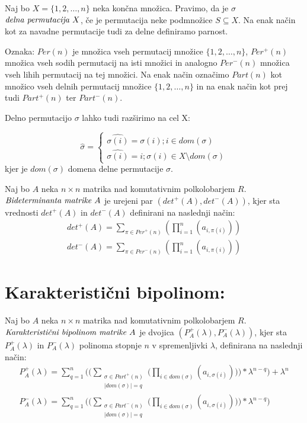 \documentclass[mat1]{fmfdelo}
\newcommand{\abs}[1]{\ensuremath{\lvert #1 \rvert}}
\newcommand{\pojem}[1]{\ensuremath{\emph{#1}}}
\begin{document}
\begin{definicija}
	Naj bo $X=\{1, 2, \ldots, n\}$ neka končna množica. Pravimo, da je $\sigma$ \pojem{delna permutacija $X$}, če je permutacija neke podmnožice $S\subseteq X$. Na enak način kot za navadne permutacije tudi za delne definiramo parnost.
	
	Oznaka: $Per(n)$ je množica vseh permutacij množice $\{1, 2, \ldots, n\}$, $Per^{+}(n)$ množica vseh sodih permutacij na isti množici in analogno $Per^{-}(n)$ množica vseh lihih permutacij na tej množici. Na enak način označimo $Part(n)$ kot množico vseh delnih permutacij množice $\{1, 2, \ldots, n\}$ in na enak način kot prej tudi $Part^{+}(n)$ ter $Part^{-}(n)$.
	
	Delno permutacijo $\sigma$ lahko tudi razširimo na cel X:
	
	$$
	\hat{\sigma} = \begin{cases*}
		\hat{\sigma(i)} = \sigma(i); i\in dom(\sigma) \\
		\hat{\sigma(i)} = i; \sigma(i) \in X\setminus dom(\sigma)
	\end{cases*}
	$$
	kjer je $dom(\sigma)$ domena delne permutacije $\sigma$.
\end{definicija}

\begin{definicija}
	Naj bo $A$ neka $n\times n$ matrika nad komutativnim polkolobarjem $R$. \pojem{Bideterminanta matrike $A$} je urejeni par $(det^{+}(A), det^{-}(A))$, kjer sta vrednosti $det^{+}(A)$ in $det^{-}(A)$ definirani na naslednji način:
	\begin{align*}
			det^{+}(A) = \sum_{\pi\in Per^{+}(n)}(\prod_{i = 1}^{n}(a_{i,\pi(i)})) \\
			det^{-}(A) = \sum_{\pi\in Per^{-}(n)}(\prod_{i = 1}^{n}(a_{i,\pi(i)}))
	\end{align*}
\end{definicija}

\section{Karakteristični bipolinom:}

\begin{definicija}
	Naj bo $A$ neka $n\times n$ matrika nad komutativnim polkolobarjem $R$. \pojem{Karakteristični bipolinom matrike $A$} je dvojica $(P^{+}_A(\lambda), P^{-}_A(\lambda))$, kjer sta $P^{+}_A(\lambda)$ in $P^{-}_A(\lambda)$ polinoma stopnje $n$ v spremenljivki $\lambda$, definirana na naslednji način:
	\begin{align*}
		P^{+}_A(\lambda) = \sum_{q = 1}^{n}\bigg(\bigg( \sum_{\substack{\sigma\in Part^{+}(n) \\ \abs{dom(\sigma)} = q}} \bigg(\prod_{i\in dom(\sigma)} (a_{i, \sigma(i)})\bigg)\bigg) *\lambda^{n-q}\bigg) + \lambda^n \\
		P^{-}_A(\lambda) = \sum_{q = 1}^{n}\bigg(\bigg( \sum_{\substack{\sigma\in Part^{-}(n) \\ \abs{dom(\sigma)} = q}} \bigg(\prod_{i\in dom(\sigma)} (a_{i, \sigma(i)})\bigg)\bigg) *\lambda^{n-q}\bigg)
	\end{align*}
\end{definicija}
\end{document}
